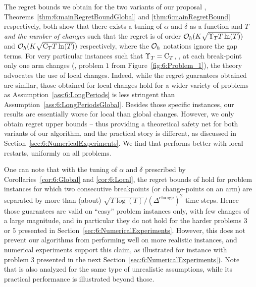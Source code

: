 The regret bounds we obtain for the two variants of our proposal \GLRklUCB{},
Theorems~\ref{thm:6:mainRegretBoundGlobal} and \ref{thm:6:mainRegretBound} respectively,
both show that there exists a tuning of $\alpha$ and $\delta$ as a function and $T$ \emph{and the number of changes} such that the regret is of order $\mathcal{O}_h(K\sqrt{\Upsilon_T T \ln(T)})$ and $\mathcal{O}_h(K\sqrt{\mathrm{C}_T T \ln(T)})$ respectively, where the $\mathcal{O}_h$ notations ignore the gap terms.
%
For very particular instances such that $\Upsilon_T = \mathrm{C}_T$, \ie, at each break-point only one arm changes (\eg, problem $1$ from Figure~\ref{fig:6:Problem_1}), the theory advocates the use of local changes.
%
Indeed, while the regret guarantees obtained are similar, those obtained for local changes hold for a wider variety of problems as Assumption~\ref{ass:6:LongPeriods} is less stringent than Assumption~\ref{ass:6:LongPeriodsGlobal}.
%
Besides those specific instances, our results are essentially worse for local than global changes. However, we only obtain regret upper bounds -- thus providing a theoretical safety net for both variants of our algorithm, and the practical story is different, as discussed in Section~\ref{sec:6:NumericalExperiments}.
We find that \GLRklUCB{} performs better with local restarts, uniformly on all problems.

One can note that with the tuning of $\alpha$ and $\delta$ prescribed by Corollaries~\ref{cor:6:Global} and \ref{cor:6:Local}, the regret bounds of \GLRklUCB{} hold for problem instances for which two consecutive breakpoints (or change-points on an arm) are separated by more than (about) $\sqrt{T\log(T)}/(\Delta^{\text{change}})^2$ time steps.
Hence those guarantees are valid on ``easy'' problem instances only, with few changes of a large magnitude, and in particular they do not hold for the harder problems $3$ or $5$ presented in Section~\ref{sec:6:NumericalExperiments}.
%
However, this does not prevent our algorithms from performing well on more realistic instances, and numerical experiments support this claim,
as illustrated for instance with problem $3$ presented in the next Section~\ref{sec:6:NumericalExperiments}).
%
Note that \MUCB{} \cite{CaoZhenKvetonXie18} is also analyzed for the same type of unrealistic assumptions, while its practical performance is illustrated beyond those.




